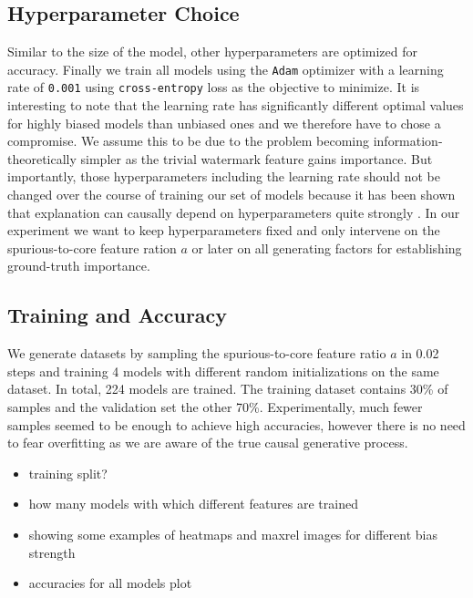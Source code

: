 \subsection{Hyperparameter Choice}
Similar to the size of the model, other hyperparameters are optimized for accuracy. 
Finally we train all models using the \verb|Adam| optimizer  with a learning rate of \verb|0.001| using \verb|cross-entropy| loss  as the objective to minimize.
It is interesting to note that the learning rate has significantly different optimal values for highly biased models than unbiased ones and we therefore have to chose a compromise. We assume this to be due to the problem becoming information-theoretically simpler as the trivial watermark feature gains importance. 
But importantly, those hyperparameters including the learning rate should not be changed over the course of training our set of models because it has been shown that explanation can causally depend on hyperparameters quite strongly \cite{Karimi2023}. In our experiment we want to keep hyperparameters fixed and only intervene on the spurious-to-core feature ration $a$ or later on all generating factors for establishing ground-truth importance. 

\subsection{Training and Accuracy}
We generate datasets by sampling the spurious-to-core feature ratio $a$ in 0.02 steps and training 4  models with different random initializations on the same dataset. In total, 224  models are trained. The training dataset contains 30\% of samples and the validation set the other 70\%. Experimentally, much fewer samples seemed to be enough to achieve high accuracies, however there is no need to fear overfitting as we are aware of the true causal generative process. 


\begin{itemize}
    \item training split?
    \item how many models with which different features are trained
    \item showing some examples of heatmaps and maxrel images for different bias strength
    \item accuracies for all models plot
\end{itemize}

